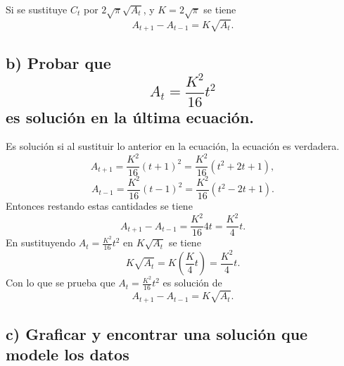\documentclass[11pt]{article}
\begin{document}
    Si se sustituye \(C_t\) por \(2\sqrt{\pi}\sqrt{A_t}\), y
\(K=2\sqrt{\pi}\) se tiene \[A_{t+1}-A_{t-1} = K\sqrt{A_t}.\]

\hypertarget{b-probar-que-a_t-frack216-t2-es-soluciuxf3n-en-la-uxfaltima-ecuaciuxf3n.}{%
\subsection*{\texorpdfstring{b) Probar que \[A_t = \frac{K^2}{16} t^2\]
es solución en la última
ecuación.}{b) Probar que A\_t = \textbackslash frac\{K\^{}2\}\{16\} t\^{}2 es solución en la última ecuación.}}\label{b-probar-que-a_t-frack216-t2-es-soluciuxf3n-en-la-uxfaltima-ecuaciuxf3n.}}

    Es solución si al sustituir lo anterior en la ecuación, la ecuación es
verdadera.
\[A_{t+1} = \frac{K^2}{16} (t+1)^2 = \frac{K^2}{16} (t^2+2t+1),\]
\[A_{t-1} = \frac{K^2}{16} (t-1)^2 = \frac{K^2}{16} (t^2-2t+1).\]
Entonces restando estas cantidades se tiene
\[A_{t+1}-A_{t-1} = \frac{K^2}{16} 4t = \frac{K^2}{4} t.\] En
sustituyendo \(A_t = \frac{K^2}{16} t^2\) en \(K\sqrt{A_t}\) se tiene
\[K\sqrt{A_t} = K\left(\frac{K}{4} t\right) = \frac{K^2}{4} t.\] Con lo
que se prueba que \(A_t = \frac{K^2}{16} t^2\) es solución de
\[A_{t+1}-A_{t-1} = K\sqrt{A_t}.\]

    \hypertarget{c-graficar-y-encontrar-una-soluciuxf3n-que-modele-los-datos}{%
\subsection*{c) Graficar y encontrar una solución que modele los
datos}\label{c-graficar-y-encontrar-una-soluciuxf3n-que-modele-los-datos}}
\end{document}

